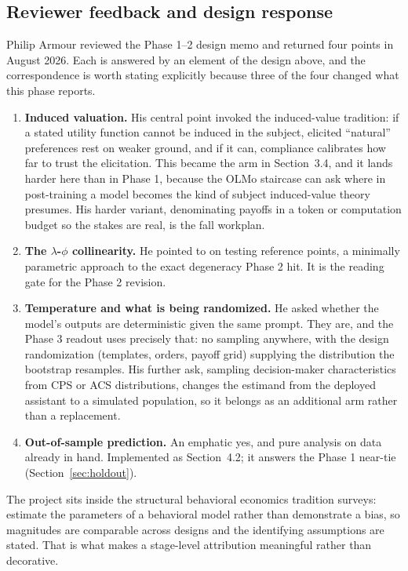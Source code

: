 \documentclass[11pt]{article}
\begin{document}
\subsection{Reviewer feedback and design response}
Philip Armour reviewed the Phase 1--2 design memo and returned four points in August 2026. Each is
answered by an element of the design above, and the correspondence is worth stating explicitly because
three of the four changed what this phase reports.

\begin{enumerate}[label=\arabic*.]
  \item \textbf{Induced valuation.} His central point invoked the induced-value tradition: if a stated
  utility function cannot be induced in the subject, elicited ``natural'' preferences rest on weaker
  ground, and if it can, compliance calibrates how far to trust the elicitation. This became the arm in
  Section~3.4, and it lands harder here than in Phase 1, because the OLMo staircase can ask where in
  post-training a model becomes the kind of subject induced-value theory presumes. His harder variant,
  denominating payoffs in a token or computation budget so the stakes are real, is the fall workplan.
  \item \textbf{The $\lambda$-$\phi$ collinearity.} He pointed to \citet{reesjones2022} on testing
  reference points, a minimally parametric approach to the exact degeneracy Phase 2 hit. It is the
  reading gate for the Phase 2 revision.
  \item \textbf{Temperature and what is being randomized.} He asked whether the model's outputs are
  deterministic given the same prompt. They are, and the Phase 3 readout uses precisely that: no
  sampling anywhere, with the design randomization (templates, orders, payoff grid) supplying the
  distribution the bootstrap resamples. His further ask, sampling decision-maker characteristics from
  CPS or ACS distributions, changes the estimand from the deployed assistant to a simulated population,
  so it belongs as an additional arm rather than a replacement.
  \item \textbf{Out-of-sample prediction.} An emphatic yes, and pure analysis on data already in hand.
  Implemented as Section~4.2; it answers the Phase 1 near-tie (Section~\ref{sec:holdout}).
\end{enumerate}

The project sits inside the structural behavioral economics tradition \citet{dellavigna2018} surveys:
estimate the parameters of a behavioral model rather than demonstrate a bias, so magnitudes are
comparable across designs and the identifying assumptions are stated. That is what makes a stage-level
attribution meaningful rather than decorative.
\end{document}
